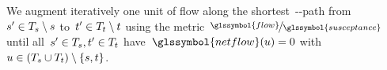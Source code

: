 We augment iteratively one unit of flow along the shortest~\source-\sink-path
from~$
    s' 
    \in 
    T_{s}\setminus s
$ to~$
    t' 
    \in 
    T_{t}\setminus t
$ using the metric~$
    \nicefrac{
        \glssymbol{flow}
    }{
        \glssymbol{susceptance}
    }
$ until all~$
    s'
    \in 
    T_{s}, 
    t'
    \in 
    T_{t}
$ have~$\glssymbol{netflow}(\vertexa) = 0$ with~$
    u
    \in
    (
        T_{s}
        \cup 
        T_{t}
    )
    \setminus
    \{s,t\}
$.
% 
% 
% 

